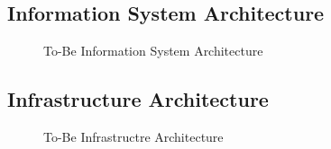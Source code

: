 \subsection{Information System Architecture}
\begin{center}
	\begin{figure}[H]
		\centering
		\setlength\fboxsep{7pt}
		\setlength\fboxrule{0.5pt}
		\caption{To-Be Information System Architecture}
		\label{fig:map_information_to_be}
	\end{figure}
\end{center}
%
\subsection{Infrastructure Architecture}
\begin{center}
	\begin{figure}[H]
		\centering
		\setlength\fboxsep{7pt}
		\setlength\fboxrule{0.5pt}
		\caption{To-Be Infrastructre Architecture}
		\label{fig:map_technology_to_be}
	\end{figure}
\end{center}